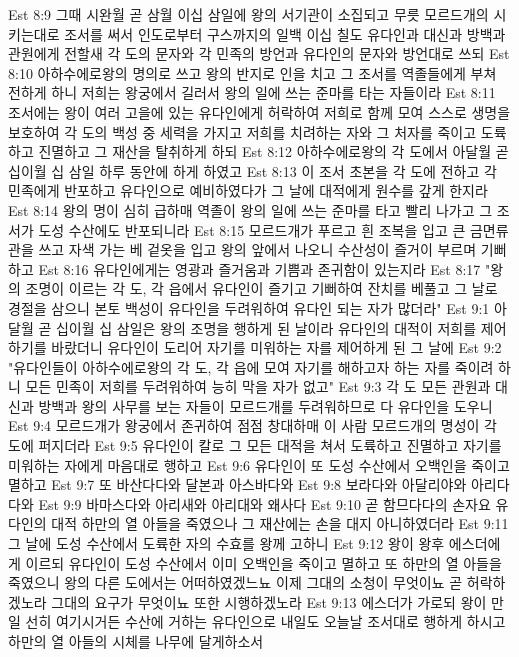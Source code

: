 Est 8:9  그때 시완월 곧 삼월 이십 삼일에 왕의 서기관이 소집되고 무릇 모르드개의 시키는대로 조서를 써서 인도로부터 구스까지의 일백 이십 칠도 유다인과 대신과 방백과 관원에게 전할새 각 도의 문자와 각 민족의 방언과 유다인의 문자와 방언대로 쓰되
Est 8:10  아하수에로왕의 명의로 쓰고 왕의 반지로 인을 치고 그 조서를 역졸들에게 부쳐 전하게 하니 저희는 왕궁에서 길러서 왕의 일에 쓰는 준마를 타는 자들이라
Est 8:11  조서에는 왕이 여러 고을에 있는 유다인에게 허락하여 저희로 함께 모여 스스로 생명을 보호하여 각 도의 백성 중 세력을 가지고 저희를 치려하는 자와 그 처자를 죽이고 도륙하고 진멸하고 그 재산을 탈취하게 하되
Est 8:12  아하수에로왕의 각 도에서 아달월 곧 십이월 십 삼일 하루 동안에 하게 하였고
Est 8:13  이 조서 초본을 각 도에 전하고 각 민족에게 반포하고 유다인으로 예비하였다가 그 날에 대적에게 원수를 갚게 한지라
Est 8:14  왕의 명이 심히 급하매 역졸이 왕의 일에 쓰는 준마를 타고 빨리 나가고 그 조서가 도성 수산에도 반포되니라
Est 8:15  모르드개가 푸르고 흰 조복을 입고 큰 금면류관을 쓰고 자색 가는 베 겉옷을 입고 왕의 앞에서 나오니 수산성이 즐거이 부르며 기뻐하고
Est 8:16  유다인에게는 영광과 즐거움과 기쁨과 존귀함이 있는지라
Est 8:17  "왕의 조명이 이르는 각 도, 각 읍에서 유다인이 즐기고 기뻐하여 잔치를 베풀고 그 날로 경절을 삼으니 본토 백성이 유다인을 두려워하여 유다인 되는 자가 많더라"
Est 9:1  아달월 곧 십이월 십 삼일은 왕의 조명을 행하게 된 날이라 유다인의 대적이 저희를 제어하기를 바랐더니 유다인이 도리어 자기를 미워하는 자를 제어하게 된 그 날에
Est 9:2  "유다인들이 아하수에로왕의 각 도, 각 읍에 모여 자기를 해하고자 하는 자를 죽이려 하니 모든 민족이 저희를 두려워하여 능히 막을 자가 없고"
Est 9:3  각 도 모든 관원과 대신과 방백과 왕의 사무를 보는 자들이 모르드개를 두려워하므로 다 유다인을 도우니
Est 9:4  모르드개가 왕궁에서 존귀하여 점점 창대하매 이 사람 모르드개의 명성이 각 도에 퍼지더라
Est 9:5  유다인이 칼로 그 모든 대적을 쳐서 도륙하고 진멸하고 자기를 미워하는 자에게 마음대로 행하고
Est 9:6  유다인이 또 도성 수산에서 오백인을 죽이고 멸하고
Est 9:7  또 바산다다와 달본과 아스바다와
Est 9:8  보라다와 아달리야와 아리다다와
Est 9:9  바마스다와 아리새와 아리대와 왜사다
Est 9:10  곧 함므다다의 손자요 유다인의 대적 하만의 열 아들을 죽였으나 그 재산에는 손을 대지 아니하였더라
Est 9:11  그 날에 도성 수산에서 도륙한 자의 수효를 왕께 고하니
Est 9:12  왕이 왕후 에스더에게 이르되 유다인이 도성 수산에서 이미 오백인을 죽이고 멸하고 또 하만의 열 아들을 죽였으니 왕의 다른 도에서는 어떠하였겠느뇨 이제 그대의 소청이 무엇이뇨 곧 허락하겠노라 그대의 요구가 무엇이뇨 또한 시행하겠노라
Est 9:13  에스더가 가로되 왕이 만일 선히 여기시거든 수산에 거하는 유다인으로 내일도 오늘날 조서대로 행하게 하시고 하만의 열 아들의 시체를 나무에 달게하소서
